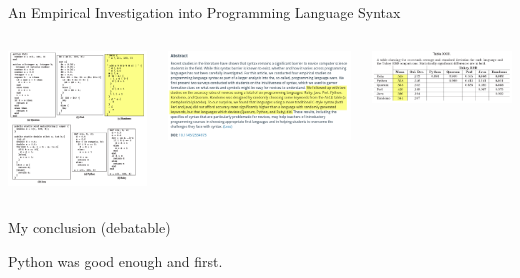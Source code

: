 \documentclass[aspectratio=169]{beamer}
\begin{document}
\begin{frame}{An Empirical Investigation into Programming Language Syntax}
\vspace{0.25 cm}
\begin{columns}
\includegraphics[width=\linewidth]{empirical-examples.png}

\includegraphics[width=\linewidth]{empirical-abstract.png}

\vspace{1 cm}
\mbox{\hspace{-1 cm}\includegraphics[width=1.25\linewidth]{empirical-table.png}}
\end{columns}
\end{frame}

\begin{frame}{My conclusion (debatable)}
\huge
\vspace{1 cm}
\begin{center}
Python was good enough and first.
\end{center}
\end{frame}

\begin{frame}{}


\end{frame}
\end{document}
